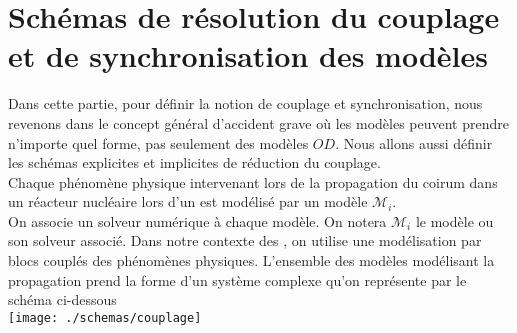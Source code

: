 \documentclass[11pt,a4paper]{scrartcl}%
\begin{document}
	\section{Schémas de résolution du couplage et de synchronisation des modèles}\label{sec3}
	Dans cette partie, pour définir la notion de couplage et synchronisation, nous revenons dans le concept général d'accident grave où les modèles peuvent prendre n'importe quel forme, pas seulement des modèles $OD$. Nous allons aussi définir les schémas explicites et implicites de réduction du couplage.\\
	Chaque phénomène physique intervenant lors de la propagation du coirum dans un réacteur nucléaire lors d'un  est modélisé par un modèle $\mathcal{M}_i$.\\
	On associe un solveur numérique à chaque modèle. On notera $\mathcal{M}_i$ le modèle ou son solveur associé. Dans notre contexte des , on utilise une modélisation par blocs couplés des phénomènes physiques. L'ensemble des modèles modélisant la propagation prend la forme d'un système complexe qu'on représente par le schéma ci-dessous\\
	\texttt{[image: ./schemas/couplage]}\\
	\label{Fig.5}
\end{document}
